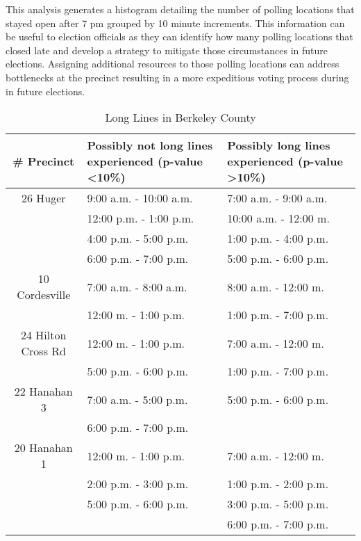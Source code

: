 This analysis generates a histogram detailing the number of polling locations that stayed open after 7 pm grouped by 10 minute increments. This information can be useful to election officials as they can identify how many polling locations that closed late and develop a strategy to mitigate those circumstances in future elections. Assigning additional resources to those polling locations can address bottlenecks at the precinct resulting in a more expeditious voting process during in future elections.
\begin{table*}
    \begin{center}
    \begin{tabular}{| c | p{5cm} | p{4.5cm} |}
    \hline                   
    \# Precinct & Possibly not long lines experienced (p-value \textless 10\%)&Possibly long lines experienced (p-value \textgreater 10\%)\\
    \hline
    26 Huger&9:00 a.m. - 10:00 a.m. &7:00 a.m. - 9:00 a.m.\\
            &12:00 p.m. - 1:00 p.m. &10:00 a.m. - 12:00 m.\\
            &4:00 p.m. - 5:00 p.m. &1:00 p.m. - 4:00 p.m.\\
            &6:00 p.m. - 7:00 p.m. &5:00 p.m. - 6:00 p.m.\\
    \hline
    10 Cordesville &7:00 a.m. - 8:00 a.m.&8:00 a.m. - 12:00 m.\\
                   &12:00 m. - 1:00 p.m.&1:00 p.m. - 7:00 p.m.\\
    \hline  
    24 Hilton Cross Rd &12:00 m. - 1:00 p.m. &7:00 a.m. - 12:00 m.\\
                       &5:00 p.m. - 6:00 p.m. &1:00 p.m. - 7:00 p.m.\\
    \hline
    22 Hanahan 3 &7:00 a.m. - 5:00 p.m. &5:00 p.m. - 6:00 p.m.\\
                 &6:00 p.m. - 7:00 p.m.&\\
    \hline
    20 Hanahan 1 &12:00 m. - 1:00 p.m. &7:00 a.m. - 12:00 m.\\
                 &2:00 p.m. - 3:00 p.m. &1:00 p.m. - 2:00 p.m.\\
                 &5:00 p.m. - 6:00 p.m. &3:00 p.m. - 5:00 p.m.\\
                 &                      &6:00 p.m. - 7:00 p.m.\\
    \hline
    \end{tabular}
    \end{center}
    \caption{Long Lines in Berkeley County}
    \label{tab:line}
\end{table*}
